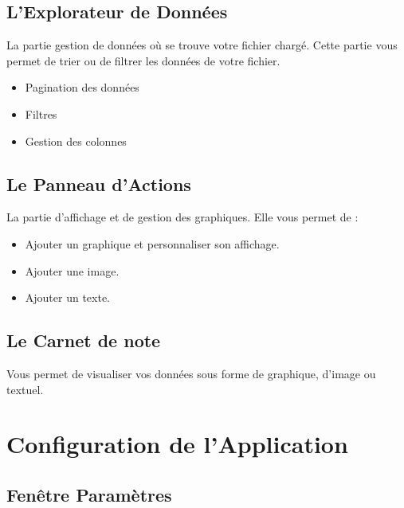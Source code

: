\documentclass[11pt,a4paper]{article}
\begin{document}
\subsection{L'Explorateur de Données}

La partie gestion de données où se trouve votre fichier chargé. Cette partie vous permet de trier ou de filtrer les données de votre fichier.

\begin{itemize}
  \item Pagination des données
  \item Filtres
  \item Gestion des colonnes
\end{itemize}

\subsection{Le Panneau d'Actions}

La partie d'affichage et de gestion des graphiques. Elle vous permet de :

\begin{itemize}
  \item Ajouter un graphique et personnaliser son affichage.
  \item Ajouter une image.
  \item Ajouter un texte.
\end{itemize}

\subsection{Le Carnet de note}

Vous permet de visualiser vos données sous forme de graphique, d'image ou textuel.

\section{Configuration de l'Application}

\subsection{Fenêtre Paramètres}
\end{document}
